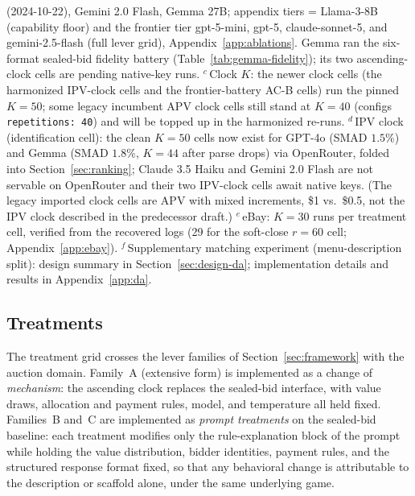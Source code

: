 \begin{table}[t]
\begin{minipage}{\textwidth}
(2024-10-22), Gemini 2.0 Flash, Gemma 27B; appendix tiers = Llama-3-8B
(capability floor) and the frontier tier gpt-5-mini, gpt-5, claude-sonnet-5,
and gemini-2.5-flash (full lever grid), Appendix~\ref{app:ablations}. Gemma ran the
six-format sealed-bid fidelity battery (Table~\ref{tab:gemma-fidelity}); its
two ascending-clock cells are pending native-key runs.
$^{c}$\,Clock $K$: the newer clock cells (the harmonized IPV-clock cells and
the frontier-battery AC-B cells) run the pinned $K=50$; some legacy incumbent
APV clock cells still stand at $K=40$ (configs \texttt{repetitions: 40}) and
will be topped up in the harmonized re-runs.
$^{d}$\,IPV clock (identification cell): the clean $K=50$ cells now exist for
GPT-4o (SMAD $1.5\%$) and Gemma (SMAD $1.8\%$, $K=44$ after parse drops) via
OpenRouter, folded into Section~\ref{sec:ranking}; Claude 3.5 Haiku and Gemini
2.0 Flash are not servable on OpenRouter and their two IPV-clock cells await
native keys. (The legacy imported clock cells are APV with mixed increments,
\$1 vs.\ \$0.5, not the IPV clock described in the predecessor draft.)
$^{e}$\,eBay: $K=30$ runs per treatment cell, verified from the recovered
logs (29 for the soft-close $r=60$ cell; Appendix~\ref{app:ebay}).
$^{f}$\,Supplementary matching experiment (menu-description split): design
summary in Section~\ref{sec:design-da}; implementation details and results
in Appendix~\ref{app:da}.
\end{minipage}
\end{table}

\subsection{Treatments}\label{sec:design-treatments}

The treatment grid crosses the lever families of Section~\ref{sec:framework}
with the auction domain. Family~A (extensive form) is implemented
as a change of \emph{mechanism}: the ascending clock replaces the sealed-bid
interface, with value draws, allocation and payment rules, model, and
temperature all held fixed. Families~B and~C are implemented as \emph{prompt
treatments} on the sealed-bid baseline: each treatment modifies
only the rule-explanation block of the prompt while holding the value
distribution, bidder identities, payment rules, and the structured response
format fixed, so that any behavioral change is attributable to the description
or scaffold alone, under the same underlying game.


